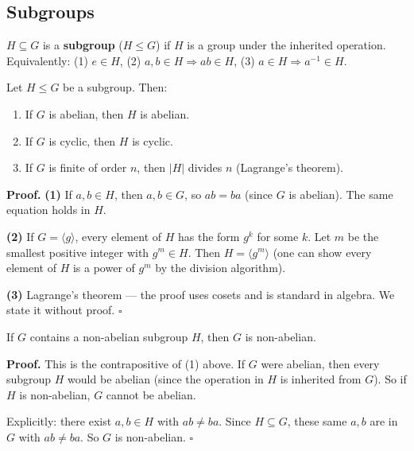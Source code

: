 \documentclass[11pt]{report}
\renewenvironment{proof}[1][Proof]{\noindent\textbf{#1.} }{\hfill$\square$\par\vspace{5pt}}
\begin{document}
\subsection{Subgroups}

\begin{defbox}[Subgroup]
$H \subseteq G$ is a \textbf{subgroup} ($H \leq G$) if $H$ is a group under the inherited operation. Equivalently: (1) $e \in H$, (2) $a, b \in H \Rightarrow ab \in H$, (3) $a \in H \Rightarrow a^{-1} \in H$.
\end{defbox}

\begin{propbox}
Let $H \leq G$ be a subgroup. Then:
\begin{enumerate}
    \item If $G$ is abelian, then $H$ is abelian.
    \item If $G$ is cyclic, then $H$ is cyclic.
    \item If $G$ is finite of order $n$, then $|H|$ divides $n$ (Lagrange's theorem).
\end{enumerate}
\end{propbox}

\begin{proof}
\textbf{(1)} If $a, b \in H$, then $a, b \in G$, so $ab = ba$ (since $G$ is abelian). The same equation holds in $H$.

\textbf{(2)} If $G = \langle g \rangle$, every element of $H$ has the form $g^k$ for some $k$. Let $m$ be the smallest positive integer with $g^m \in H$. Then $H = \langle g^m \rangle$ (one can show every element of $H$ is a power of $g^m$ by the division algorithm).

\textbf{(3)} Lagrange's theorem --- the proof uses cosets and is standard in algebra. We state it without proof.
\end{proof}

\begin{propbox}
If $G$ contains a non-abelian subgroup $H$, then $G$ is non-abelian.
\end{propbox}

\begin{proof}
This is the contrapositive of (1) above. If $G$ were abelian, then every subgroup $H$ would be abelian (since the operation in $H$ is inherited from $G$). So if $H$ is non-abelian, $G$ cannot be abelian.

Explicitly: there exist $a, b \in H$ with $ab \neq ba$. Since $H \subseteq G$, these same $a, b$ are in $G$ with $ab \neq ba$. So $G$ is non-abelian.
\end{proof}
\end{document}
